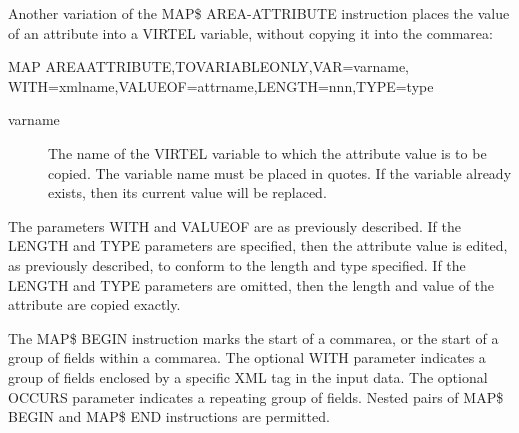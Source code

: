 \documentclass[letterpaper,10pt,english]{sphinxmanual}
\begin{document}
Another variation of the MAP\$ AREA-ATTRIBUTE instruction places the value of an attribute into a VIRTEL variable, without copying it into the commarea:

\begin{sphinxVerbatim}[commandchars=\\\{\}]
MAP\PYGZdl{} AREA\PYGZhy{}ATTRIBUTE,TO\PYGZhy{}VARIABLE\PYGZhy{}ONLY,VAR=\PYGZsq{}varname\PYGZsq{},
    WITH=\PYGZsq{}xmlname\PYGZsq{},VALUEOF=\PYGZsq{}attrname\PYGZsq{},LENGTH=nnn,TYPE=type
\end{sphinxVerbatim}
\begin{description}
\item[{varname}] \leavevmode
The name of the VIRTEL variable to which the attribute value is to be copied. The variable name must be placed in quotes. If the variable already exists, then its current value will be replaced.

\end{description}

The parameters WITH and VALUEOF are as previously described. If the LENGTH and TYPE parameters are specified, then the attribute value is edited, as previously described, to conform to the length and type specified. If the LENGTH and TYPE parameters are omitted, then the length and value of the attribute are copied exactly.


The MAP\$ BEGIN instruction marks the start of a commarea, or the start of a group of fields within a commarea. The optional WITH parameter indicates a group of fields enclosed by a specific XML tag in the input data. The optional OCCURS parameter indicates a repeating group of fields. Nested pairs of MAP\$ BEGIN and MAP\$ END instructions are
permitted.
\end{document}
